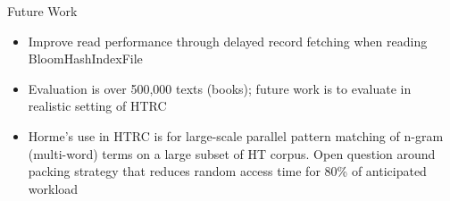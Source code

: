 \documentclass[newPxFont]{beamer}
\begin{document}
\begin{frame}[c]{Future Work}

  \begin{itemize}
    \item Improve read performance through delayed record fetching when reading BloomHashIndexFile
    \item Evaluation is over 500,000 texts (books); future work is to evaluate in realistic setting of HTRC 
    \item Horme's use in HTRC is for large-scale parallel pattern matching of n-gram (multi-word) terms on a large subset of HT corpus.  Open question around packing strategy that reduces random access time for 80\% of anticipated workload
  \end{itemize}
\end{frame}
\end{document}
